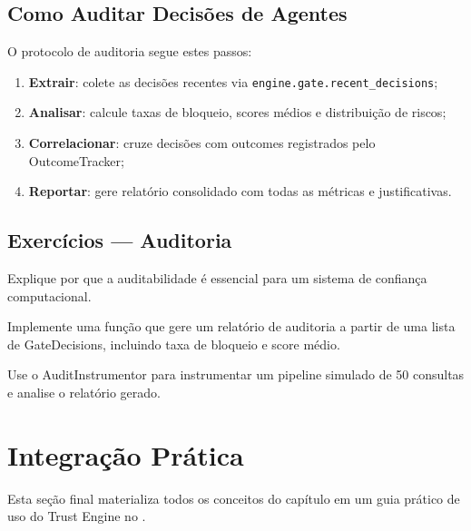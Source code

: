 \subsection{Como Auditar Decisões de Agentes}

O protocolo de auditoria segue estes passos:
\begin{enumerate}
\item \textbf{Extrair}: colete as decisões recentes via
\lstinline{engine.gate.recent_decisions};
\item \textbf{Analisar}: calcule taxas de bloqueio, scores médios e
distribuição de riscos;
\item \textbf{Correlacionar}: cruze decisões com outcomes registrados
pelo OutcomeTracker;
\item \textbf{Reportar}: gere relatório consolidado com todas as
métricas e justificativas.
\end{enumerate}

\subsection{Exercícios — Auditoria}
\begin{exercicio}
Explique por que a auditabilidade é essencial para um sistema de
confiança computacional.
\end{exercicio}
\begin{exercicio}
Implemente uma função que gere um relatório de auditoria a partir de
uma lista de GateDecisions, incluindo taxa de bloqueio e score médio.
\end{exercicio}
\begin{exercicio}
Use o AuditInstrumentor para instrumentar um pipeline simulado de 50
consultas e analise o relatório gerado.
\end{exercicio}

\section{Integração Prática}
\label{sec:integracao-pratica}
\nivelbasico

Esta seção final materializa todos os conceitos do capítulo em um guia
prático de uso do Trust Engine no \opencodeeco{}.

